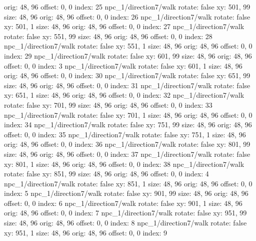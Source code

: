   orig: 48, 96
  offset: 0, 0
  index: 25
npc_1/direction7/walk
  rotate: false
  xy: 501, 99
  size: 48, 96
  orig: 48, 96
  offset: 0, 0
  index: 26
npc_1/direction7/walk
  rotate: false
  xy: 501, 1
  size: 48, 96
  orig: 48, 96
  offset: 0, 0
  index: 27
npc_1/direction7/walk
  rotate: false
  xy: 551, 99
  size: 48, 96
  orig: 48, 96
  offset: 0, 0
  index: 28
npc_1/direction7/walk
  rotate: false
  xy: 551, 1
  size: 48, 96
  orig: 48, 96
  offset: 0, 0
  index: 29
npc_1/direction7/walk
  rotate: false
  xy: 601, 99
  size: 48, 96
  orig: 48, 96
  offset: 0, 0
  index: 3
npc_1/direction7/walk
  rotate: false
  xy: 601, 1
  size: 48, 96
  orig: 48, 96
  offset: 0, 0
  index: 30
npc_1/direction7/walk
  rotate: false
  xy: 651, 99
  size: 48, 96
  orig: 48, 96
  offset: 0, 0
  index: 31
npc_1/direction7/walk
  rotate: false
  xy: 651, 1
  size: 48, 96
  orig: 48, 96
  offset: 0, 0
  index: 32
npc_1/direction7/walk
  rotate: false
  xy: 701, 99
  size: 48, 96
  orig: 48, 96
  offset: 0, 0
  index: 33
npc_1/direction7/walk
  rotate: false
  xy: 701, 1
  size: 48, 96
  orig: 48, 96
  offset: 0, 0
  index: 34
npc_1/direction7/walk
  rotate: false
  xy: 751, 99
  size: 48, 96
  orig: 48, 96
  offset: 0, 0
  index: 35
npc_1/direction7/walk
  rotate: false
  xy: 751, 1
  size: 48, 96
  orig: 48, 96
  offset: 0, 0
  index: 36
npc_1/direction7/walk
  rotate: false
  xy: 801, 99
  size: 48, 96
  orig: 48, 96
  offset: 0, 0
  index: 37
npc_1/direction7/walk
  rotate: false
  xy: 801, 1
  size: 48, 96
  orig: 48, 96
  offset: 0, 0
  index: 38
npc_1/direction7/walk
  rotate: false
  xy: 851, 99
  size: 48, 96
  orig: 48, 96
  offset: 0, 0
  index: 4
npc_1/direction7/walk
  rotate: false
  xy: 851, 1
  size: 48, 96
  orig: 48, 96
  offset: 0, 0
  index: 5
npc_1/direction7/walk
  rotate: false
  xy: 901, 99
  size: 48, 96
  orig: 48, 96
  offset: 0, 0
  index: 6
npc_1/direction7/walk
  rotate: false
  xy: 901, 1
  size: 48, 96
  orig: 48, 96
  offset: 0, 0
  index: 7
npc_1/direction7/walk
  rotate: false
  xy: 951, 99
  size: 48, 96
  orig: 48, 96
  offset: 0, 0
  index: 8
npc_1/direction7/walk
  rotate: false
  xy: 951, 1
  size: 48, 96
  orig: 48, 96
  offset: 0, 0
  index: 9


